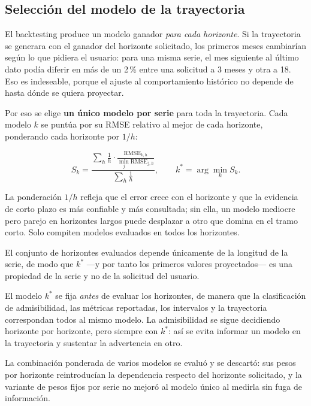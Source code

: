 \documentclass[11pt,letterpaper]{article}
\begin{document}
\subsection{Selección del modelo de la trayectoria}
\label{sec:modelo}

El backtesting produce un modelo ganador \emph{para cada horizonte}. Si la
trayectoria se generara con el ganador del horizonte solicitado, los primeros
meses cambiarían según lo que pidiera el usuario: para una misma serie, el mes
siguiente al último dato podía diferir en más de un 2\,\% entre una solicitud a
3 meses y otra a 18. Eso es indeseable, porque el ajuste al comportamiento
histórico no depende de hasta dónde se quiera proyectar.

Por eso se elige \textbf{un único modelo por serie} para toda la trayectoria.
Cada modelo \(k\) se puntúa por su RMSE relativo al mejor de cada horizonte,
ponderando cada horizonte por \(1/h\):

\begin{equation}
S_k=\frac{\displaystyle\sum_{h}\frac{1}{h}\cdot\frac{\mathrm{RMSE}_{k,h}}{\min_j \mathrm{RMSE}_{j,h}}}
{\displaystyle\sum_{h}\frac{1}{h}},
\qquad
k^{*}=\arg\min_k S_k .
\end{equation}

La ponderación \(1/h\) refleja que el error crece con el horizonte y que la
evidencia de corto plazo es más confiable y más consultada; sin ella, un modelo
mediocre pero parejo en horizontes largos puede desplazar a otro que domina en
el tramo corto. Solo compiten modelos evaluados en todos los horizontes.

El conjunto de horizontes evaluados depende únicamente de la longitud de la
serie, de modo que \(k^{*}\) ---y por tanto los primeros valores
proyectados--- es una propiedad de la serie y no de la solicitud del usuario.

El modelo \(k^{*}\) se fija \emph{antes} de evaluar los horizontes, de manera
que la clasificación de admisibilidad, las métricas reportadas, los intervalos
y la trayectoria correspondan todos al mismo modelo. La admisibilidad se sigue
decidiendo horizonte por horizonte, pero siempre con \(k^{*}\): así se evita
informar un modelo en la trayectoria y sustentar la advertencia en otro.

La combinación ponderada de varios modelos se evaluó y se descartó: sus pesos
por horizonte reintroducían la dependencia respecto del horizonte solicitado, y
la variante de pesos fijos por serie no mejoró al modelo único al medirla sin
fuga de información.
\end{document}
